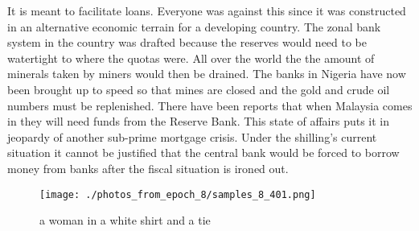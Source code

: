\documentclass{article}%
\begin{document}
It is meant to facilitate loans. Everyone was against this since it was constructed in an alternative economic terrain for a developing country.\newline%
The zonal bank system in the country was drafted because the reserves would need to be watertight to where the quotas were.\newline%
All over the world the the amount of minerals taken by miners would then be drained. The banks in Nigeria have now been brought up to speed so that mines are closed and the gold and crude oil numbers must be replenished.\newline%
There have been reports that when Malaysia comes in they will need funds from the Reserve Bank. This state of affairs puts it in jeopardy of another sub{-}prime mortgage crisis.\newline%
Under the shilling’s current situation it cannot be justified that the central bank would be forced to borrow money from banks after the fiscal situation is ironed out.\newline%

%


\begin{figure}[h!]%
\centering%
\texttt{[image: ./photos\_from\_epoch\_8/samples\_8\_401.png]}%
\caption{a woman in a white shirt and a tie}%
\end{figure}

%
\end{document}

